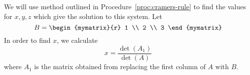 \begin{solution}
  We will use method outlined in Procedure~\ref{proc:cramers-rule} to
  find the values for $x,y,z$ which give the solution to this system.
  Let
  \begin{equation*}
    B = 
    \begin{mymatrix}{r}
      1 \\
      2 \\
      3
    \end{mymatrix} 
  \end{equation*}
  In order to find $x$, we calculate
  \begin{equation*}
    x =
    \frac{\det(A_{1})}{\det(A)}
  \end{equation*}
  where $A_1$ is the matrix obtained from replacing the first column
  of $A$ with $B$.


\end{solution}
